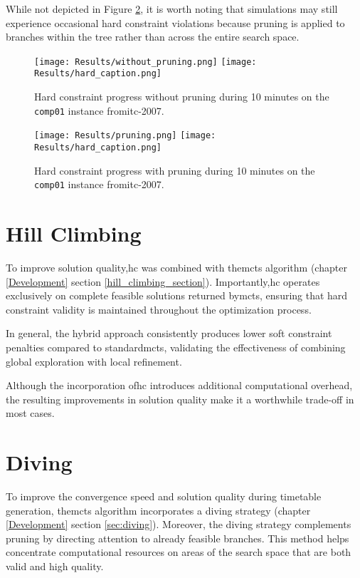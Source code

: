 While not depicted in Figure \ref{fig:pruning_result}, it is worth noting that simulations may still experience occasional hard constraint violations because pruning is applied to branches within the tree rather than across the entire search space.

\begin{figure}
 \centering
     \texttt{[image: Results/without\_pruning.png]}
     \texttt{[image: Results/hard\_caption.png]}
     \caption{Hard constraint progress without pruning during 10 minutes on the \texttt{comp01} instance from\ac{itc-2007}.}
     \label{fig:without_pruning_result}
\end{figure}

\begin{figure}
 \centering
    \texttt{[image: Results/pruning.png]}
    \texttt{[image: Results/hard\_caption.png]}
    \caption{Hard constraint progress with pruning during 10 minutes on the \texttt{comp01} instance from\ac{itc-2007}.}
    \label{fig:pruning_result}
\end{figure}

\section{Hill Climbing}

To improve solution quality,\ac{hc} was combined with the\ac{mcts} algorithm (chapter \ref{Development} section \ref{hill_climbing_section}). Importantly,\ac{hc} operates exclusively on complete feasible solutions returned by\ac{mcts}, ensuring that hard constraint validity is maintained throughout the optimization process.

In general, the hybrid approach consistently produces lower soft constraint penalties compared to standard\ac{mcts}, validating the effectiveness of combining global exploration with local refinement. 

Although the incorporation of\ac{hc} introduces additional computational overhead, the resulting improvements in solution quality make it a worthwhile trade-off in most cases.
   
\section{Diving}

To improve the convergence speed and solution quality during timetable generation, the\ac{mcts} algorithm incorporates a diving strategy (chapter \ref{Development} section \ref{sec:diving}). Moreover, the diving strategy complements pruning by directing attention to already feasible branches. This method helps concentrate computational resources on areas of the search space that are both valid and high quality.

